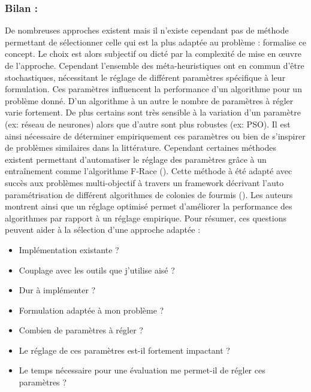\subsubsection{Bilan :} %
\label{ssub:bilan}
De nombreuses approches existent mais il n’existe cependant pas de méthode permettant de
sélectionner celle qui est la plus adaptée au problème : \cite{Wolpert199767} formalise
ce concept. Le choix est alors subjectif ou dicté par la complexité de mise en œuvre
de l’approche.
Cependant l’ensemble des méta-heuristiques ont en commun d’être stochastiques, nécessitant
le réglage de différent paramètres spécifique à leur formulation. Ces paramètres
influencent la performance d’un algorithme pour un problème donné. D’un algorithme à un autre le nombre de
paramètres à régler varie fortement. De plus certains sont très sensible à la variation
d’un paramètre (ex: réseau de neurones) alors que d’autre sont plus robustes (ex: PSO).
Il est ainsi nécessaire de déterminer empiriquement ces paramètres ou bien de s’inspirer
de problèmes similaires dans la littérature.
Cependant certaines méthodes existent permettant d’automatiser le réglage des
paramètres grâce à un entraînement comme l’algorithme F-Race (\cite{Birattari2010311}).
Cette méthode à été adapté avec succès aux problèmes multi-objectif à travers un framework
décrivant l’auto paramétrisation de différent algorithmes de colonies de fourmis (\cite{Lopez-Ibanez2012861}).
Les auteurs montrent ainsi que un réglage optimisé permet d’améliorer la performance
des algorithmes par rapport à un réglage empirique.
Pour résumer, ces questions peuvent aider à la sélection d’une approche adaptée :
\begin{itemize}
  \item Implémentation existante ?
  \item Couplage avec les outils que j’utilise aisé ?
  \item Dur à implémenter ?
  \item Formulation adaptée à mon problème ?
  \item Combien de paramètres à régler ?
  \item Le réglage de ces paramètres est-il fortement impactant ?
  \item Le temps nécessaire pour une évaluation me permet-il de régler ces paramètres ?
\end{itemize}



